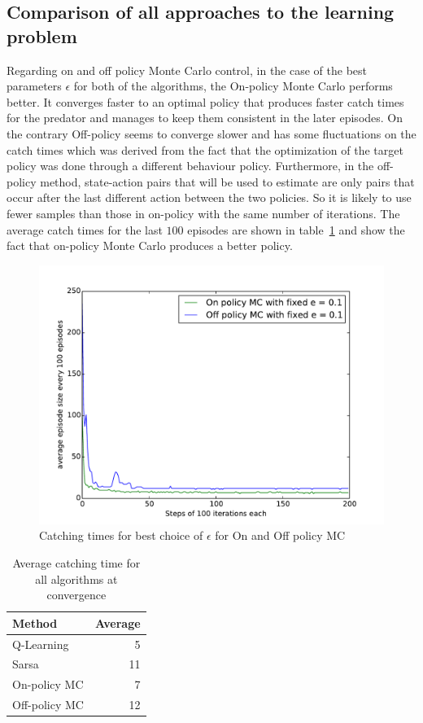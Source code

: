 \documentclass[paper=a4, fontsize=11pt]{scrartcl}
\numberwithin{equation}{section}		%
\numberwithin{figure}{section}			%
\numberwithin{table}{section}				%
\begin{document}
\subsection{Comparison of all approaches to the learning problem}
Regarding on and off policy Monte Carlo control, in the case of the best parameters $\epsilon$ for both of the algorithms, the On-policy Monte Carlo performs better. It converges faster to an optimal policy that produces faster catch times for the predator and manages to keep them consistent in the later episodes. On the contrary Off-policy seems to converge slower and has some fluctuations on the catch times which was derived from the fact that the optimization of the target policy was done through a different behaviour policy. Furthermore, in the off-policy method, state-action pairs that will be used to estimate are only pairs that occur after the last different action between the two policies. So it is likely to use fewer samples than those in on-policy with the same number of iterations. The average catch times for the last $100$ episodes are shown in table~\ref{compavg} and show the fact that on-policy Monte Carlo produces a better policy.
\begin{figure}[H] \centering
\includegraphics[scale=0.6]{onOffComp.pdf}
\caption{Catching times for best choice of $\epsilon$ for On and Off policy MC}\label{figure:onoffcomp} 
\end{figure}

\begin{table}[H]
\caption{Average catching time for all algorithms at convergence}
\centering
\begin{tabular}{|l|r|}
\hline
Method & Average \\\hline
Q-Learning& 5 \\\hline
Sarsa& 11 \\\hline
On-policy MC& 7\\\hline
Off-policy MC& 12\\\hline
\end{tabular}
\label{compavg}
\end{table}
\end{document}
